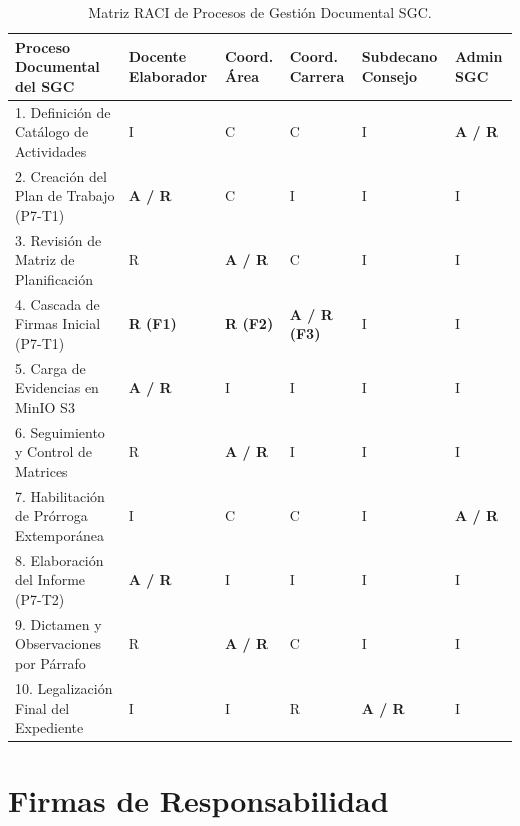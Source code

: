 \documentclass[12pt,a4paper]{article}
\begin{document}
\begin{table}[htbp]
\centering
\small
\renewcommand{\arraystretch}{1.15}
\begin{tabularx}{\textwidth}{|X|>{\centering\arraybackslash}m{1.5cm}|>{\centering\arraybackslash}m{1.5cm}|>{\centering\arraybackslash}m{1.5cm}|>{\centering\arraybackslash}m{1.5cm}|>{\centering\arraybackslash}m{1.5cm}|}
\hline
\rowcolor{tableheader}
Proceso Documental del SGC & Docente Elaborador & Coord. Área & Coord. Carrera & Subdecano Consejo & Admin SGC \\
\hline
1. Definición de Catálogo de Actividades & I & C & C & I & \textbf{A / R} \\
\hline
2. Creación del Plan de Trabajo (P7-T1) & \textbf{A / R} & C & I & I & I \\
\hline
3. Revisión de Matriz de Planificación & R & \textbf{A / R} & C & I & I \\
\hline
4. Cascada de Firmas Inicial (P7-T1) & \textbf{R (F1)} & \textbf{R (F2)} & \textbf{A / R (F3)} & I & I \\
\hline
5. Carga de Evidencias en MinIO S3 & \textbf{A / R} & I & I & I & I \\
\hline
6. Seguimiento y Control de Matrices & R & \textbf{A / R} & I & I & I \\
\hline
7. Habilitación de Prórroga Extemporánea & I & C & C & I & \textbf{A / R} \\
\hline
8. Elaboración del Informe (P7-T2) & \textbf{A / R} & I & I & I & I \\
\hline
9. Dictamen y Observaciones por Párrafo & R & \textbf{A / R} & C & I & I \\
\hline
10. Legalización Final del Expediente & I & I & R & \textbf{A / R} & I \\
\hline
\end{tabularx}
\caption{Matriz RACI de Procesos de Gestión Documental SGC.}
\label{tab:matriz_raci}
\end{table}

\vspace{0.3cm}

\section{Firmas de Responsabilidad}
\end{document}
